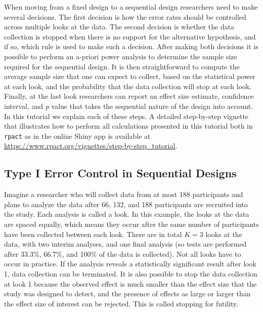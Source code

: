 \documentclass[
  english,
  ,jou, a4paper,floatsintext]{apa6}
\begin{document}
When moving from a fixed design to a sequential design researchers need to make several decisions. The first decision is how the error rates should be controlled across multiple looks at the data. The second decision is whether the data collection is stopped when there is no support for the alternative hypothesis, and if so, which rule is used to make such a decision. After making both decisions it is possible to perform an a-priori power analysis to determine the sample size required for the sequential design. It is then straightforward to compute the average sample size that one can expect to collect, based on the statistical power at each look, and the probability that the data collection will stop at each look. Finally, at the last look researchers can report an effect size estimate, confidence interval, and \emph{p} value that takes the sequential nature of the design into account. In this tutorial we explain each of these steps. A detailed step-by-step vignette that illustrates how to perform all calculations presented in this tutorial both in \texttt{rpact} as in the online Shiny app is available at \url{https://www.rpact.org/vignettes/step-by-step_tutorial}.

\hypertarget{type-i-error-control-in-sequential-designs}{%
\subsection{Type I Error Control in Sequential Designs}\label{type-i-error-control-in-sequential-designs}}

Imagine a researcher who will collect data from at most 188 participants and plans to analyze the data after 66, 132, and 188 participants are recruited into the study. Each analysis is called a look. In this example, the looks at the data are spaced equally, which means they occur after the same number of participants have been collected between each look. There are in total \(K = 3\) looks at the data, with two interim analyses, and one final analysis (so tests are performed after 33.3\%, 66.7\%, and 100\% of the data is collected). Not all looks have to occur in practice. If the analysis reveals a statistically significant result after look 1, data collection can be terminated. It is also possible to stop the data collection at look 1 because the observed effect is much smaller than the effect size that the study was designed to detect, and the presence of effects as large or larger than the effect size of interest can be rejected. This is called stopping for futility.
\end{document}
